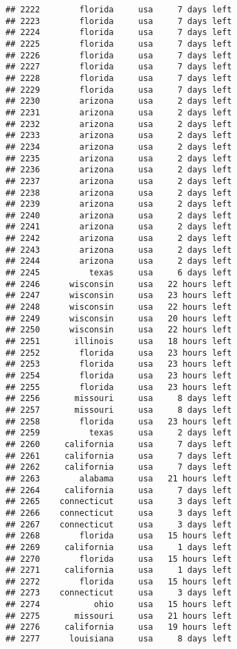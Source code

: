 \documentclass[
]{article}
\begin{document}
\begin{verbatim}
## 2222        florida     usa     7 days left
## 2223        florida     usa     7 days left
## 2224        florida     usa     7 days left
## 2225        florida     usa     7 days left
## 2226        florida     usa     7 days left
## 2227        florida     usa     7 days left
## 2228        florida     usa     7 days left
## 2229        florida     usa     7 days left
## 2230        arizona     usa     2 days left
## 2231        arizona     usa     2 days left
## 2232        arizona     usa     2 days left
## 2233        arizona     usa     2 days left
## 2234        arizona     usa     2 days left
## 2235        arizona     usa     2 days left
## 2236        arizona     usa     2 days left
## 2237        arizona     usa     2 days left
## 2238        arizona     usa     2 days left
## 2239        arizona     usa     2 days left
## 2240        arizona     usa     2 days left
## 2241        arizona     usa     2 days left
## 2242        arizona     usa     2 days left
## 2243        arizona     usa     2 days left
## 2244        arizona     usa     2 days left
## 2245          texas     usa     6 days left
## 2246      wisconsin     usa   22 hours left
## 2247      wisconsin     usa   23 hours left
## 2248      wisconsin     usa   22 hours left
## 2249      wisconsin     usa   20 hours left
## 2250      wisconsin     usa   22 hours left
## 2251       illinois     usa   18 hours left
## 2252        florida     usa   23 hours left
## 2253        florida     usa   23 hours left
## 2254        florida     usa   23 hours left
## 2255        florida     usa   23 hours left
## 2256       missouri     usa     8 days left
## 2257       missouri     usa     8 days left
## 2258        florida     usa   23 hours left
## 2259          texas     usa     2 days left
## 2260     california     usa     7 days left
## 2261     california     usa     7 days left
## 2262     california     usa     7 days left
## 2263        alabama     usa   21 hours left
## 2264     california     usa     7 days left
## 2265    connecticut     usa     3 days left
## 2266    connecticut     usa     3 days left
## 2267    connecticut     usa     3 days left
## 2268        florida     usa   15 hours left
## 2269     california     usa     1 days left
## 2270        florida     usa   15 hours left
## 2271     california     usa     1 days left
## 2272        florida     usa   15 hours left
## 2273    connecticut     usa     3 days left
## 2274           ohio     usa   15 hours left
## 2275       missouri     usa   21 hours left
## 2276     california     usa   19 hours left
## 2277      louisiana     usa     8 days left

\end{verbatim}
\end{document}
